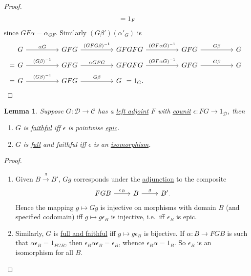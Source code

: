 \documentclass{article}
\newtheorem{nlemma}[nthm]{Lemma}
\begin{document}
\begin{proof}
\begin{align*}
\begin{tikzcd}[ampersand replacement=\&, column sep=huge]
    \end{tikzcd}
    = 1_F
  \end{align*}
  since $GF\alpha = \alpha_{GF}$.
  Similarly $(G\beta')(\alpha'_G)$ is
  \begin{align*}
    &\begin{tikzcd}[ampersand replacement=\&, column sep=huge]
    G \rar{\alpha G} \& GFG \rar{(GFG\beta)^{-1}} \& GFGFG \rar{(GF\alpha G)^{-1}} \& GFG \rar{G\beta} \& G
    \end{tikzcd} \\
    =
    &\begin{tikzcd}[ampersand replacement=\&, column sep=huge]
      G \rar{(G\beta)^{-1}} \& GFG \rar{\alpha GFG} \& GFGFG \rar{(GF\alpha G)^{-1}} \& GFG \rar{G\beta} \& G
    \end{tikzcd} \\
    =
    &\begin{tikzcd}[ampersand replacement=\&, column sep=huge]
    G \rar{(G\beta)^{-1}} \& GFG \rar{G\beta} \& G
    \end{tikzcd}
    = 1_G. \qedhere
  \end{align*}
\end{proof}
\begin{nlemma}\label{lem:3.9}
  Suppose $G: \mathscr{D} \to \mathscr{C}$ has a \hyperlink{def:adj}{left adjoint} $F$ with \hyperlink{def:counit}{counit} $\epsilon: FG \to 1_{\mathscr{D}}$, then
  \begin{enumerate}[label=(\roman*)]
    \item $G$ is \hyperlink{def:full}{faithful} iff $\epsilon$ is pointwise \hyperlink{def:epic}{epic}.
    \item $G$ is \hyperlink{def:full}{full} and faithful iff $\epsilon$ is an \hyperlink{def:natiso}{isomorphism}.
  \end{enumerate}
\end{nlemma}
\begin{proof}\leavevmode
  \begin{enumerate}[label=(\roman*)]
    \item Given $B \xrightarrow{g} B'$, $Gg$ corresponds under the \hyperlink{def:adj}{adjunction} to the composite
      \begin{equation*}
        \begin{tikzcd}
          FGB \rar{\epsilon_B} & B \rar{g} & B'.
        \end{tikzcd}
      \end{equation*}
      Hence the mapping $g \mapsto Gg$ is injective on morphisms with domain $B$ (and specified codomain) iff $g \mapsto g \epsilon_B$ is injective, i.e.\ iff $\epsilon_B$ is epic.
    \item Similarly, $G$ is \hyperlink{def:full}{full and faithful} iff $g \mapsto g \epsilon_B$ is bijective.
      If $\alpha: B \to FGB$ is such that $\alpha \epsilon_B = 1_{FGB}$, then $\epsilon_B \alpha \epsilon_B = \epsilon_B$, whence $\epsilon_B \alpha = 1_B$.
      So $\epsilon_B$ is an isomorphism for all $B$. \qedhere
  \end{enumerate}
\end{proof}
\end{document}
